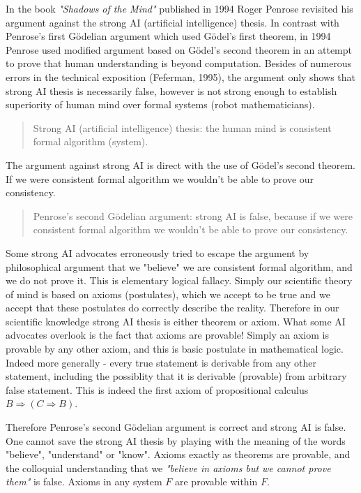 \documentclass[12pt]{article}
\begin{document}
In the book \emph{"Shadows of the Mind"} published in 1994 Roger Penrose revisited his argument against the strong AI (artificial intelligence) thesis. In contrast with Penrose's first G\"odelian argument which used G\"odel's first theorem, in 1994 Penrose used modified argument based on G\"odel's second theorem in an attempt to prove that human understanding is beyond computation. Besides of numerous errors in the technical exposition (Feferman, 1995), the argument only shows that strong AI thesis is necessarily false, however is not strong enough to establish superiority of human mind over formal systems (robot mathematicians).

\begin{verse}Strong AI (artificial intelligence) thesis: the human mind is consistent formal algorithm (system).
\end{verse}

The argument against strong AI is direct with the use of G\"odel's second theorem. If we were consistent formal algorithm we wouldn't be able to prove our consistency.

\begin{verse}
Penrose's second G\"odelian argument: strong AI is false, because if we were consistent formal algorithm we wouldn't be able to prove our consistency.
\end{verse}

Some strong AI advocates erroneously tried to escape the argument by philosophical argument that we "believe" we are consistent formal algorithm, and we do not prove it. This is elementary logical fallacy. Simply our scientific theory of mind is based on axioms (postulates), which we accept to be true and we accept that these postulates do correctly describe the reality. Therefore in our scientific knowledge strong AI thesis is either theorem or axiom. What some AI advocates overlook is the fact that axioms are provable! Simply an axiom is provable by any other axiom, and this is basic postulate in mathematical logic. Indeed more generally - every true statement is derivable from any other statement, including the possiblity that it is derivable (provable) from arbitrary false statement. This is indeed the first axiom of propositional calculus $B \Rightarrow (C \Rightarrow B)$.

Therefore Penrose's second G\"odelian argument is correct and strong AI is false. One cannot save the strong AI thesis by playing with the meaning of the words "believe", "understand" or "know". Axioms exactly as theorems are provable, and the colloquial understanding that we \emph{"believe in axioms but we cannot prove them"} is false. Axioms in any system $F$ are provable within $F$.
\end{document}
